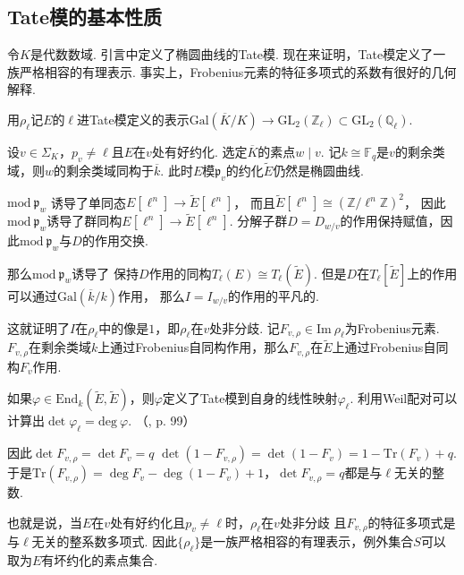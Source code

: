 \subsection{Tate模的基本性质}

令$K$是代数数域.
引言中定义了椭圆曲线的Tate模.
现在来证明，Tate模定义了一族严格相容的有理表示. 事实上，Frobenius元素的特征多项式的系数有很好的几何解释.

用$\rho_{\ell}$记$E$的$\ell$进Tate模定义的表示$\mathrm{Gal}(\overline{K}/K)\to \mathrm{GL}_2(\mathbb{Z}_{\ell})\subset \mathrm{GL}_2(\mathbb{Q}_{\ell})$.

设$v\in \Sigma_K$，$p_v\neq \ell$且$E$在$v$处有好约化. 选定$\overline{K}$的素点$w\mid v$.
记$k\cong \mathbb{F}_q$是$v$的剩余类域，则$w$的剩余类域同构于$\overline{k}$.
此时$E$模$\mathfrak{p}_v$的约化$\tilde{E}$仍然是椭圆曲线.

$\mathrm{mod}\ \mathfrak{p}_{w}$
诱导了单同态$E[\ell^n]\to \tilde{E}[\ell^n]$，
而且$\tilde{E}[\ell^n]\cong (\mathbb{Z}/\ell^n \mathbb{Z})^2$，
因此$\mathrm{mod}\ \mathfrak{p}_{w}$诱导了群同构$E[\ell^n]\to \tilde{E}[\ell^n]$.
分解子群$D=D_{w/v}$的作用保持赋值，因此$\mathrm{mod}\ \mathfrak{p}_{w}$与$D$的作用交换.

那么$\mathrm{mod}\ \mathfrak{p}_{w}$诱导了
保持$D$作用的同构$T_{\ell}(E)\cong T_{\ell}(\tilde{E})$.
但是$D$在$T_{\ell}[\tilde{E}]$上的作用可以通过$\mathrm{Gal}(\overline{k}/k)$作用，
那么$I=I_{w/v}$的作用的平凡的.

这就证明了$I$在$\rho_{\ell}$中的像是$1$，即$\rho_{\ell}$在$v$处非分歧.
记$F_{v,\rho}\in \mathrm{Im}\ \rho_{\ell}$为Frobenius元素.
$F_{v,\rho}$在剩余类域$k$上通过Frobenius自同构作用，那么$F_{v,\rho}$在$\tilde{E}$上通过Frobenius自同构$F_v$作用.

如果$\varphi\in\mathrm{End}_{k}(\tilde{E}, \tilde{E})$，则$\varphi$定义了Tate模到自身的线性映射$\varphi_{\ell}$.
利用Weil配对可以计算出$\det \varphi_{\ell} = \mathrm{deg}\ \varphi$.
（\parencite{silverman2009arithmetic}, p. 99）

因此$\det F_{v,\rho} = \det F_v = q$
$\det (1-F_{v,\rho}) = \det (1-F_v) = 1 - \mathrm{Tr}(F_v) + q$.
于是$\mathrm{Tr}(F_{v,\rho}) = \deg F_v - \deg (1-F_v) + 1$，$\det F_{v,\rho} = q$都是与$\ell$无关的整数.

也就是说，当$E$在$v$处有好约化且$p_v\neq \ell$时，$\rho_{\ell}$在$v$处非分歧
且$F_{v,\rho}$的特征多项式是与$\ell$无关的整系数多项式.
因此$\{\rho_{\ell}\}$是一族严格相容的有理表示，例外集合$S$可以取为$E$有坏约化的素点集合.

